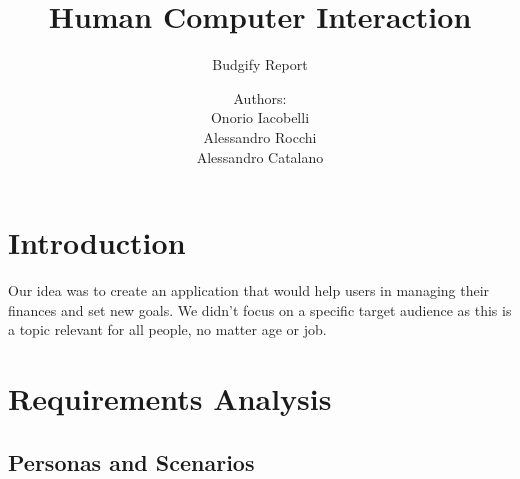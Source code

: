 \documentclass[a4paper,12pt]{article}
\title{Human Computer Interaction}
\author{Budgify Report}
\date{Authors:\\ Onorio Iacobelli\\Alessandro Rocchi\\Alessandro Catalano}
\begin{document}
\maketitle

\tableofcontents

\section{Introduction}
Our idea was to create an application that would help users in managing their finances and set new goals. We didn't focus on a specific target audience as this is a topic relevant for all people, no matter age or job.

\section{Requirements Analysis}

\subsection{Personas and Scenarios}
\end{document}
